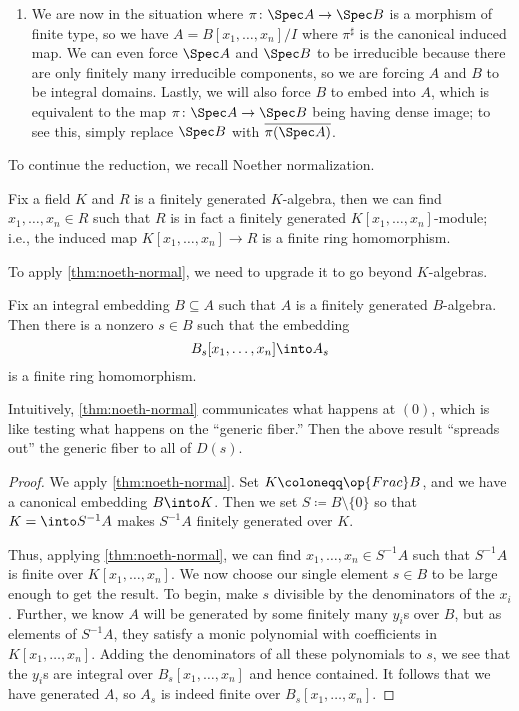 \documentclass[../notes.tex]{subfiles}
\begin{document}
\begin{enumerate}
	\item We are now in the situation where $\pi\colon\Spec A\to\Spec B$ is a morphism of finite type, so we have $A=B[x_1,\ldots,x_n]/I$ where $\pi^\sharp$ is the canonical induced map. We can even force $\Spec A$ and $\Spec B$ to be irreducible because there are only finitely many irreducible components, so we are forcing $A$ and $B$ to be integral domains. Lastly, we will also force $B$ to embed into $A$, which is equivalent to the map $\pi\colon\Spec A\to\Spec B$ being having dense image; to see this, simply replace $\Spec B$ with $\overline{\pi(\Spec A)}$.
\end{enumerate}
To continue the reduction, we recall Noether normalization.
\begin{theorem} \label{thm:noeth-normal}
	Fix a field $K$ and $R$ is a finitely generated $K$-algebra, then we can find $x_1,\ldots,x_n\in R$ such that $R$ is in fact a finitely generated $K[x_1,\ldots,x_n]$-module; i.e., the induced map $K[x_1,\ldots,x_n]\to R$ is a finite ring homomorphism.
\end{theorem}
To apply \autoref{thm:noeth-normal}, we need to upgrade it to go beyond $K$-algebras.
\begin{lemma}
	Fix an integral embedding $B\subseteq A$ such that $A$ is a finitely generated $B$-algebra. Then there is a nonzero $s\in B$ such that the embedding
	\[B_s[x_1,\ldots,x_n]\into A_s\]
	is a finite ring homomorphism.
\end{lemma}
Intuitively, \autoref{thm:noeth-normal} communicates what happens at $(0)$, which is like testing what happens on the ``generic fiber.'' Then the above result ``spreads out'' the generic fiber to all of $D(s)$.
\begin{proof}
	We apply \autoref{thm:noeth-normal}. Set $K\coloneqq\op{Frac}B$, and we have a canonical embedding $B\into K$. Then we set $S\coloneqq B\setminus\{0\}$ so that $K=\into S^{-1}A$ makes $S^{-1}A$ finitely generated over $K$.

	Thus, applying \autoref{thm:noeth-normal}, we can find $x_1,\ldots,x_n\in S^{-1}A$ such that $S^{-1}A$ is finite over $K[x_1,\ldots,x_n]$. We now choose our single element $s\in B$ to be large enough to get the result. To begin, make $s$ divisible by the denominators of the $x_i$. Further, we know $A$ will be generated by some finitely many $y_i$s over $B$, but as elements of $S^{-1}A$, they satisfy a monic polynomial with coefficients in $K[x_1,\ldots,x_n]$. Adding the denominators of all these polynomials to $s$, we see that the $y_i$s are integral over $B_s[x_1,\ldots,x_n]$ and hence contained. It follows that we have generated $A$, so $A_s$ is indeed finite over $B_s[x_1,\ldots,x_n]$.
\end{proof}
\end{document}
